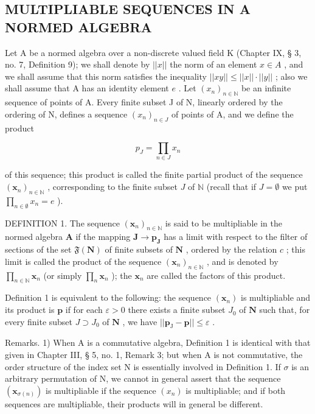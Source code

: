 \subsection{MULTIPLIABLE SEQUENCES IN A NORMED ALGEBRA}

Let A be a normed algebra over a non-discrete valued field K (Chapter IX, § 3, no. 7, Definition 9); we shall denote by \(||x||\) the norm of an element \(x \in A\) , and we shall assume that this norm satisfies the inequality \(||xy|| \leqslant ||x|| \cdot ||y||\) ; also we shall assume that A has an identity element \(e\) . Let \((x_n)_{n \in \mathbb{N}}\) be an infinite sequence of points of A. Every finite subset J of N, linearly ordered by the ordering of N, defines a sequence \((x_n)_{n \in J}\) of points of A, and we define the product

\[
p _ {J} = \prod_ {n \in J} x _ {n}
\]

of this sequence; this product is called the finite partial product of the sequence \((\pmb{x}_n)_{n\in \mathbb{N}}\) , corresponding to the finite subset \(J\) of \(\mathbb{N}\) (recall that if \(J = \emptyset\) we put \(\prod_{n\in \emptyset}x_n = e\) ).

DEFINITION 1. The sequence \((\pmb{x}_n)_{n\in \mathbb{N}}\) is said to be multipliable in the normed algebra \(\mathbf{A}\) if the mapping \(\mathbf{J}\to \pmb{p}_{\mathbf{J}}\) has a limit with respect to the filter of sections of the set \(\mathfrak{F}(\mathbf{N})\) of finite subsets of \(\mathbf{N}\) , ordered by the relation \(c\) ; this limit is called the product of the sequence \((\pmb{x}_n)_{n\in \mathbb{N}}\) , and is denoted by \(\prod_{n\in \mathbb{N}}\pmb{x}_n\) (or simply \(\prod_{n}\pmb{x}_n\) ); the \(\pmb{x}_n\) are called the factors of this product.

Definition 1 is equivalent to the following: the sequence \((\pmb{x}_n)\) is multipliable and its product is \(\pmb{p}\) if for each \(\varepsilon > 0\) there exists a finite subset \(J_0\) of \(\mathbf{N}\) such that, for every finite subset \(J \supset J_0\) of \(\mathbf{N}\) , we have \(||\pmb{p}_{\mathrm{J}} - \pmb{p}|| \leqslant \varepsilon\) .

Remarks. 1) When A is a commutative algebra, Definition 1 is identical with that given in Chapter III, § 5, no. 1, Remark 3; but when A is not commutative, the order structure of the index set N is essentially involved in Definition 1. If \(\sigma\) is an arbitrary permutation of N, we cannot in general assert that the sequence \((\pmb{x}_{\sigma(n)})\) is multipliable if the sequence \((x_{n})\) is multipliable; and if both sequences are multipliable, their products will in general be different.

